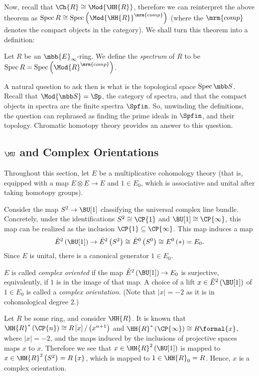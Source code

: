 Now, recall that $\Ch{R} \cong \Mod{\HH{R}}$, therefore we can reinterpret the above theorem as $\spec R \cong \spec\left( \Mod{\HH{R}}^\mrm{comp} \right)$ (where the $\mrm{comp}$ denotes the compact objects in the category).
We shall turn this theorem into a definition:

\begin{definition}
	Let $R$ be an $\mbb{E}_\infty$-ring.
	We define the \emph{spectrum} of $R$ to be
	$\spec R = \spec\left( \Mod{R}^\mrm{comp} \right)$.
\end{definition}

A natural question to ask then is what is the topological space $\spec \SS$.
Recall that $\Mod{\SS} = \Sp$, the category of spectra, and that the compact objects in spectra are the finite spectra $\Spfin$.
So, unwinding the definitions, the question can rephrased as finding the prime ideals in $\Spfin$, and their topology.
Chromatic homotopy theory provides an answer to this question.



\subsection{\texorpdfstring{$\MU$}{MU} and Complex Orientations}

Throughout this section, let $E$ be a multiplicative cohomology theory (that is, equipped with a map $E \otimes E \to E$ and $1 \in E_0$, which is associative and unital after taking homotopy groups).

Consider the map $S^2 \to \BU[1]$ classifying the universal complex line bundle.
Concretely, under the identifications $S^2 \cong \CP{1}$ and $\BU[1] \cong \CP{\infty}$, this map can be realized as the inclusion $\CP{1} \subseteq \CP{\infty}$.
This map induces a map
$$
	\tilde{E}^2\left(\BU[1]\right)
	\to \tilde{E}^2\left(S^2\right)
	\cong \tilde{E}^0\left(S^0\right)
	\cong E^0\left(*\right)
	= E_0.
$$
Since $E$ is unital, there is a canonical generator $1 \in E_0$.

\begin{definition}
	$E$ is called \emph{complex oriented} if the map $\tilde{E}^2\left(\BU[1]\right) \to E_0$ is surjective, equivalently, if $1$ is in the image of that map.
	A choice of a lift $x \in \tilde{E}^2\left(\BU[1]\right)$ of $1 \in E_0$ is called a \emph{complex orientation}.
	(Note that $\left|x\right| = -2$ as it is in cohomological degree $2$.)
\end{definition}

\begin{example}\label{HR-1}
	Let $R$ be some ring, and consider $\HH{R}$.
	It is known that
	$\HH{R}^*\left(\CP{n}\right) \cong R \left[x\right] / \left(x^{n+1}\right)$
	and
	$\HH{R}^*\left(\CP{\infty}\right) \cong R \formal{x}$,
	where $\left|x\right| = -2$,
	and the maps induced by the inclusions of projective spaces maps $x$ to $x$.
	Therefore we see that $x \in \HH{R}^2\left(\BU[1]\right)$ is mapped to $x \in \HH{R}^2\left(S^2\right) = R\left\{x\right\}$, which is mapped to $1 \in \HH{R}_0 = R$.
	Hence, $x$ is a complex orientation.
\end{example}

